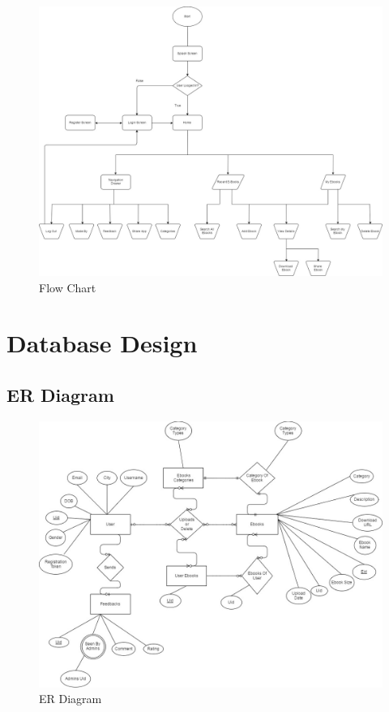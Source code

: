 \begin{figure}[ht]
	\includegraphics[scale=0.34]{images/Flowchart.jpg}
	\caption{Flow Chart}
\end{figure}

\newpage


\section{Database Design}

	\subsection{ER Diagram}
	
	\begin{figure}[ht]
		\centering
		\includegraphics[scale=0.40]{images/erdiagram.jpg}
		\caption{ER Diagram}
	\end{figure}
	

